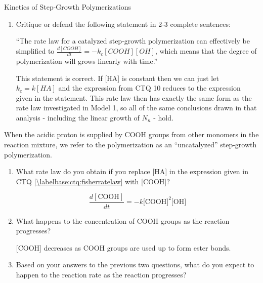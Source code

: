 \begin{activity}{Kinetics of Step-Growth Polymerizations}
\begin{ctqs}
\begin{enumerate}
			\item Critique or defend the following statement in 2-3 complete sentences:
			
				``The rate law for a catalyzed step-growth polymerization can effectively be simplified to $\frac{d[COOH]}{dt} = - k_c [COOH][OH]$, which means that the degree of polymerization will grows linearly with time.''
			
				\begin{solution}[1.75in]{}
				
				This statement is correct.  If [HA] is constant then we can just let $k_c = k[HA]$ and the expression from CTQ 10 reduces to the expression given in the statement.  This rate law then has exactly the same form as the rate law investigated in Model 1, so all of the same conclusions drawn in that analysis - including the linear growth of $N_n$ - hold.
				
				\end{solution}
				
		\end{enumerate}
		
	\question When the acidic proton is supplied by COOH groups from other monomers in the reaction mixture, we refer to the polymerization as an ``uncatalyzed'' step-growth polymerization.
	
		\begin{enumerate}
				
			\item  What rate law do you obtain if you replace [HA] in the expression given in CTQ \ref{\labelbase:ctq:fisherratelaw} with [COOH]?
			
				\begin{solution}[0.75in]	{}
					\begin{equation*}
						\frac{d[\text{COOH}]}{dt} = - k \text{[COOH]}^2\text{[OH]}
					\end{equation*}
				\end{solution}
		
			\item What happens to the concentration of COOH groups as the reaction progresses?
			
				\begin{solution}[0.75in]	{}
					[COOH] decreases as COOH groups are used up to form ester bonds.
				\end{solution}
			
			\item Based on your answers to the previous two questions, what do you expect to happen to the reaction rate as the reaction progresses?
			

\end{enumerate}
\end{ctqs}
\end{activity}
